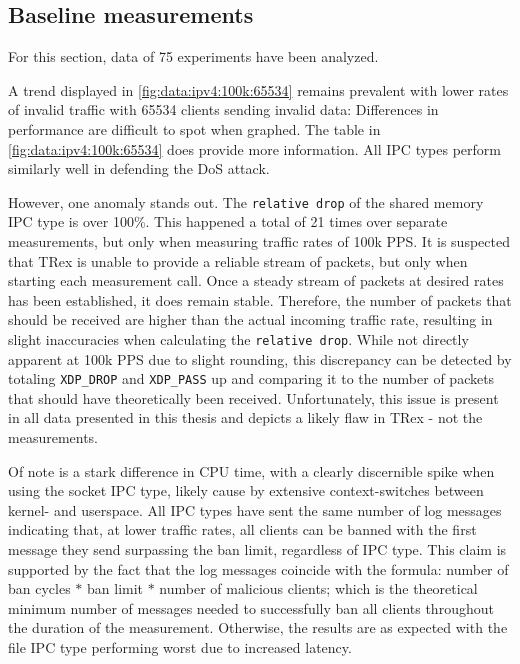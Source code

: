 \subsection{Baseline measurements}
For this section, data of 75 experiments have been analyzed.

A trend displayed in \ref{fig:data:ipv4:100k:65534} remains prevalent with lower rates of invalid traffic with 65534 clients sending invalid data:
Differences in performance are difficult to spot when graphed.
The table in \ref{fig:data:ipv4:100k:65534} does provide more information.
All \ac{IPC} types perform similarly well in defending the \ac{DoS} attack.

However, one anomaly stands out.
The \texttt{relative drop} of the shared memory \ac{IPC} type is over 100\%.
This happened a total of 21 times over separate measurements, but only when measuring traffic rates of 100k \ac{PPS}.
It is suspected that TRex is unable to provide a reliable stream of packets, but only when starting each measurement call.
Once a steady stream of packets at desired rates has been established, it does remain stable.
Therefore, the number of packets that should be received are higher than the actual incoming traffic rate, resulting in slight inaccuracies when calculating the \texttt{relative drop}.
While not directly apparent at 100k \ac{PPS} due to slight rounding, this discrepancy can be detected by totaling \texttt{XDP\_DROP} and \texttt{XDP\_PASS} up and comparing it to the number of packets that should have theoretically been received.
Unfortunately, this issue is present in all data presented in this thesis and depicts a likely flaw in TRex - not the measurements.

Of note is a stark difference in \ac{CPU} time, with a clearly discernible spike when using the socket \ac{IPC} type, likely cause by extensive context-switches between kernel- and userspace.
All \ac{IPC} types have sent the same number of log messages indicating that, at lower traffic rates, all clients can be banned with the first message they send surpassing the ban limit, regardless of \ac{IPC} type.
This claim is supported by the fact that the log messages coincide with the formula:
number of ban cycles $*$ ban limit $*$ number of malicious clients;
which is the theoretical minimum number of messages needed to successfully ban all clients throughout the duration of the measurement. 
Otherwise, the results are as expected with the file \ac{IPC} type performing worst due to increased latency.


